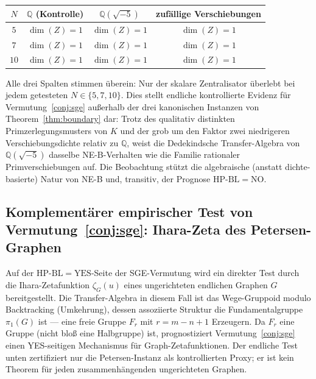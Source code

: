 \documentclass[11pt]{article}
\theoremstyle{definition}
\theoremstyle{remark}
\newcommand{\HBL}{\mathrm{HP\text{-}BL}}
\begin{document}
\begin{center}
\begin{tabular}{@{}c c c c@{}}
\toprule
$N$ & $\mathbb{Q}$ (Kontrolle) & $\mathbb{Q}(\sqrt{-5})$ & zufällige Verschiebungen \\
\midrule
$5$ & $\dim(Z) = 1$ & $\dim(Z) = 1$ & $\dim(Z) = 1$ \\
$7$ & $\dim(Z) = 1$ & $\dim(Z) = 1$ & $\dim(Z) = 1$ \\
$10$ & $\dim(Z) = 1$ & $\dim(Z) = 1$ & $\dim(Z) = 1$ \\
\bottomrule
\end{tabular}
\end{center}

Alle drei Spalten stimmen überein: Nur der skalare Zentralisator überlebt bei
jedem getesteten $N \in \{5, 7, 10\}$. Dies stellt endliche kontrollierte Evidenz
für Vermutung~\ref{conj:sge} außerhalb der drei kanonischen Instanzen von
Theorem~\ref{thm:boundary} dar: Trotz des qualitativ distinkten
Primzerlegungsmusters von $K$ und der grob um den Faktor zwei niedrigeren Verschiebungsdichte relativ zu $\mathbb{Q}$,
weist die Dedekindsche Transfer-Algebra von $\mathbb{Q}(\sqrt{-5})$
dasselbe NE-B-Verhalten wie die Familie rationaler Primverschiebungen auf.
Die Beobachtung stützt die algebraische (anstatt dichte-basierte) Natur von NE-B
und, transitiv, der Prognose $\HBL = \mathrm{NO}$.

\subsection{Komplementärer empirischer Test von
Vermutung~\ref{conj:sge}: Ihara-Zeta des Petersen-Graphen}
\label{sec:sge-ihara-test}

Auf der $\HBL = \mathrm{YES}$-Seite der SGE-Vermutung wird ein direkter
Test durch die Ihara-Zetafunktion $\zeta_G(u)$ eines ungerichteten
endlichen Graphen $G$ bereitgestellt. Die Transfer-Algebra in diesem Fall
ist das Wege-Gruppoid modulo Backtracking (Umkehrung), dessen assoziierte Struktur die
Fundamentalgruppe $\pi_1(G)$ ist --- eine freie Gruppe $F_r$ mit $r = m - n + 1$
Erzeugern. Da $F_r$ eine Gruppe (nicht bloß eine Halbgruppe) ist,
prognostiziert Vermutung~\ref{conj:sge} einen YES-seitigen Mechanismus
für Graph-Zetafunktionen. Der endliche Test unten zertifiziert nur die
Petersen-Instanz als kontrollierten Proxy; er ist kein Theorem für jeden
zusammenhängenden ungerichteten Graphen.
\end{document}
